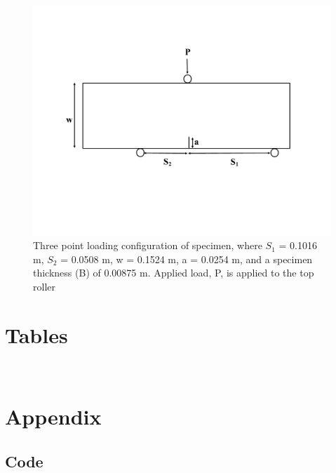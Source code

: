 \documentclass[12pt]{article}
\begin{document}
\begin{figure}[H]
	\centering
	\includegraphics[width=1\textwidth]{Geometry_Mixed.png}
	\caption{Three point loading configuration of specimen, where $S_{1}$ = 0.1016 m, $S_{2}$ = 0.0508 m, w = 0.1524 m, a = 0.0254 m, and a specimen thickness (B) of 0.00875 m. Applied load, P, is applied to the top roller}
	\label{fig:Geometry_Mixed}
\end{figure}	 
\section{Tables}
\
\section{Appendix}

\subsection{Code}

\begin{verbatim}

\end{verbatim}




\end{document}
